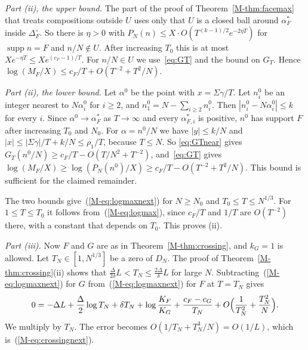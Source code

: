 \documentclass[EJP,preprint]{ejpecp}
\newcommand{\mref}[1]{\ref*{M-#1}}
\newcommand{\meqref}[1]{(\mref{#1})}
\newcommand{\supp}{\operatorname{supp}}
\begin{document}
\emph{Part \textup{(ii)}, the upper bound.} The part of the proof of
Theorem~\mref{thm:facemax} that treats compositions outside $U$ uses only that
$U$ is a closed ball around $\alpha^*_F$ inside $\Delta_F^\circ$. So there is
$\eta>0$ with $P_N(n)\le X\cdot O(T^{(k-1)/2}e^{-2\eta T})$ for $\supp n=F$ and
$n/N\notin U$. After increasing $T_0$ this is at most
$Xe^{-\eta T}\le Xe^{(c_F-1)/T}$. For $n/N\in U$ we use~\eqref{eq:GT} and the
bound on $G_T$. Hence $\log(M_F/X)\le c_F/T+O(T^{-2}+T^2/N)$.

\emph{Part \textup{(ii)}, the lower bound.} Let $\alpha^0$ be the point with
$x=\Sigma\gamma/T$. Let $n^0_i$ be an integer nearest to $N\alpha^0_i$ for
$i\ge2$, and $n^0_1=N-\sum_{i\ge2}n^0_i$. Then
$|n^0_i-N\alpha^0_i|\le k$ for every $i$. Since $\alpha^0\to\alpha^*_F$ as
$T\to\infty$ and every $\alpha^*_{F,i}$ is positive, $n^0$ has support $F$
after increasing $T_0$ and $N_0$. For $\alpha=n^0/N$ we have $|y|\le k/N$ and
$|x|\le|\Sigma\gamma|/T+k/N\le\rho_1/T$, because $T\le N$. So
\eqref{eq:GTnear} gives $G_T(n^0/N)\ge c_F/T-O(T/N^2+T^{-2})$,
and~\eqref{eq:GT} gives
$\log(M_F/X)\ge\log(P_N(n^0)/X)\ge c_F/T-O(T^{-2}+T^2/N)$. This bound is sufficient for the claimed remainder.

The two bounds give~\meqref{eq:logmaxnext} for $N\ge N_0$ and
$T_0\le T\le N^{1/3}$. For $1\le T\le T_0$ it follows from~\meqref{eq:logmax},
since $c_F/T$ and $1/T$ are $O(T^{-2})$ there, with a constant that depends
on $T_0$. This proves (ii).

\emph{Part \textup{(iii)}.} Now $F$ and $G$ are as in
Theorem~\mref{thm:crossing}, and $k_G=1$ is allowed. Let $T_N\in[1,N^{1/3}]$ be
a zero of $D_N$. The proof of Theorem~\mref{thm:crossing}(ii) shows that
$\frac\Delta{2\delta}L<T_N\le\frac{2\Delta}\delta L$ for large $N$.
Subtracting~\meqref{eq:logmaxnext} for $G$ from~\meqref{eq:logmaxnext} for $F$
at $T=T_N$ gives
\[
0=-\Delta L+\frac\Delta2\log T_N+\delta T_N+\log\frac{K_F}{K_G}
+\frac{c_F-c_G}{T_N}+O\Bigl(\frac1{T_N^2}+\frac{T_N^2}N\Bigr).
\]
We multiply by $T_N$. The error becomes $O(1/T_N+T_N^3/N)=O(1/L)$, which
is~\meqref{eq:crossingnext}.
\end{document}
